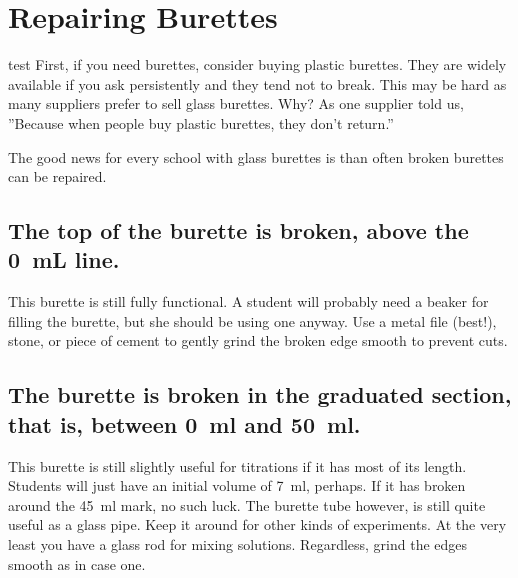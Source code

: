 \chapter{Repairing Burettes}
\label{cha:burettes}
test
First, if you need burettes, consider buying plastic burettes. They are widely available if you ask persistently and they tend not to break. This may be hard as many suppliers prefer to sell glass burettes. Why? As one supplier told us, ''Because when people buy plastic burettes, they don’t return.''

The good news for every school with glass burettes is than often broken burettes can be repaired.

\section{The top of the burette is broken, 
above the 0~mL line.}

This burette is still fully functional. 
A student will probably need a beaker for filling the burette, 
but she should be using one anyway. 
Use a metal file (best!), 
stone, 
or piece of cement to gently grind the broken edge smooth to prevent cuts.

\section{The burette is broken in the graduated section, 
that is, 
between 0~ml and 50~ml.}
This burette is still slightly useful for titrations 
if it has most of its length. 
Students will just have an initial volume of 7~ml, 
perhaps. 
If it has broken around the 45~ml mark, 
no such luck. 
The burette tube however, 
is still quite useful as a glass pipe. 
Keep it around for other kinds of experiments. 
At the very least you have a glass rod for mixing solutions. 
Regardless, 
grind the edges smooth as in case one.


